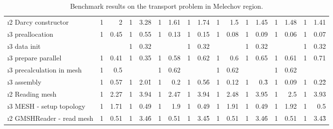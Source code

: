 \begin{sidewaystable}[!htbp]
\begin{tabular}{|l|r|r|r|r|r|r|r|r|r|r|r|r|r|r|r|r|}
\i{2}  Darcy constructor                   &   1   &   2   &   1   &   3.28    &   1   &   1.61    &   1   &   1.74    &   1   &   1.5 &   1   &   1.45    &   1   &   1.48    &   1   &   1.41    \\
\i{3}   preallocation                     &   1   &   0.45    &   1   &   0.55    &   1   &   0.13    &   1   &   0.15    &   1   &   0.08    &   1   &   0.09    &   1   &   0.06    &   1   &   0.07    \\
\i{3}   data init                         &       &           &   1   &   0.32    &       &           &   1   &   0.32    &       &           &   1   &   0.32    &       &           &   1   &   0.32    \\
\i{3}   prepare parallel                  &   1   &   0.41    &   1   &   0.35    &   1   &   0.58    &   1   &   0.62    &   1   &   0.6 &   1   &   0.65    &   1   &   0.61    &   1   &   0.71    \\
\i{3}   precalculation in mesh            &   1   &   0.5     &       &           &   1   &   0.62    &       &           &   1   &   0.62    &   &           &   1   &   0.62    &       &      \\
\i{3}   assembly                          &   1   &   0.57    &   1   &   2.01\r  &   1   &   0.2 &   1   &   0.56\r  &   1   &   0.12    &   1   &   0.3\r & 1   &   0.09    &   1   &   0.22\r \\
\i{2}  Reading mesh                        &   1   &   2.27    &   1   &   3.94    &   1   &   2.47    &   1   &   3.94    &   1   &   2.48    &   1   &   3.95    &   1   &   2.5 &   1   &   3.93    \\
\i{3}   MESH - setup topology             &   1   &   1.71    &   1   &   0.49    &   1   &   1.9 &   1   &   0.49    &   1   &   1.91    &   1   &   0.49    &   1   &   1.92    &   1   &   0.5 \\
\i{2}  GMSHReader - read mesh            &   1   &   0.51    &   1   &   3.46\r  &   1   &   0.51    &   1   &   3.45\r  &   1   &   0.51    &   1   &   3.46\r  &   1   &   0.51    &   1   &   3.43\r  \\
\hline
\end{tabular}
\caption{Benchmark results on the transport problem in Melechov region.}
\label{tab:profiler_Mel1}
\end{sidewaystable}